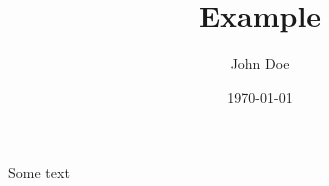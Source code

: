 \documentclass[titlepage]{article}
\title{Example}
\author{John Doe}
\date{\today}
\begin{document}
\maketitle
Some text
\end{document}

